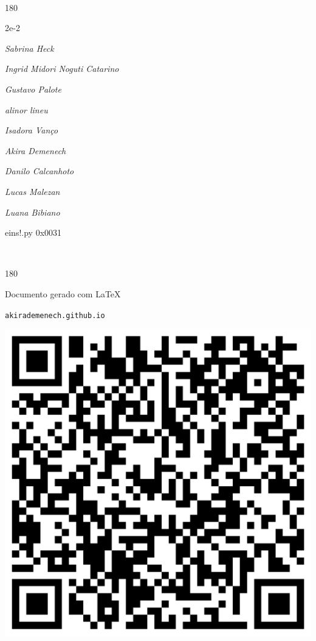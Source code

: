 \documentclass[12pt]{article}
\begin{document}
	\ 
	\vfill
	\begin{turn}{180}	
		\begin{minipage}{\textwidth}
		  	\ttfamily %
			\centering
			{\Huge 2e-2}
		  
			\hfill
		  
			

\textit{\small Sabrina Heck}

\textit{\small Ingrid Midori Noguti Catarino}

\textit{\small Gustavo Palote}

\textit{\small alinor lineu}

\textit{\small Isadora Vanço}

\textit{\small Akira Demenech}

\textit{\small Danilo Calcanhoto}

\textit{\small Lucas Malezan}

\textit{\small Luana Bibiano}

\bigskip

eins!.py
0x0031


		\end{minipage}	
	\end{turn}
	\vfill
	\

\pagebreak

	\begin{turn}{180}	
		\begin{minipage}{\textwidth}		  
		  Documento gerado com \LaTeX			
		  
		  \texttt{akirademenech.github.io}

		  \includegraphics[height=0.3\textheight]{2e-2.pdf}

		\end{minipage}	
	\end{turn}  
		  
\end{document}
